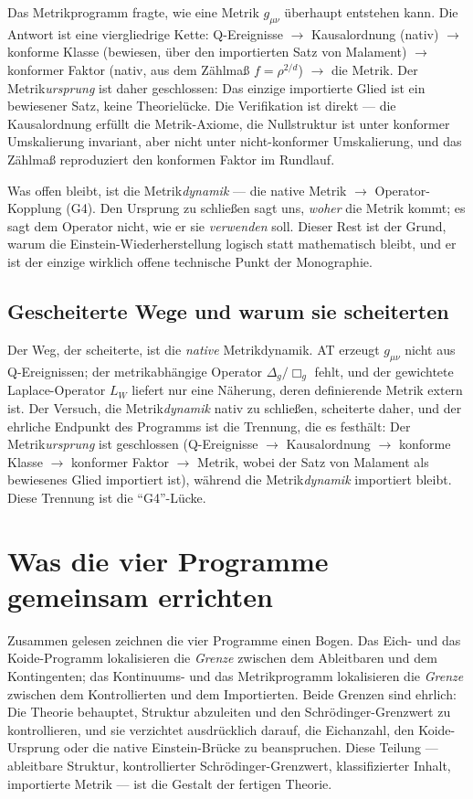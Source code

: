\documentclass[10pt,twoside,openany]{book}
\begin{document}
Das Metrikprogramm fragte, wie eine Metrik $g_{\mu\nu}$ überhaupt entstehen kann. Die
Antwort ist eine viergliedrige Kette: Q-Ereignisse $\to$ Kausalordnung (nativ) $\to$
konforme Klasse (bewiesen, über den importierten Satz von Malament) $\to$ konformer
Faktor (nativ, aus dem Zählmaß $f=\rho^{2/d}$) $\to$ die Metrik. Der
Metrik\emph{ursprung} ist daher geschlossen: Das einzige importierte Glied ist ein
bewiesener Satz, keine Theorielücke. Die Verifikation ist direkt --- die Kausalordnung
erfüllt die Metrik-Axiome, die Nullstruktur ist unter konformer Umskalierung invariant,
aber nicht unter nicht-konformer Umskalierung, und das Zählmaß reproduziert den konformen
Faktor im Rundlauf.

Was offen bleibt, ist die Metrik\emph{dynamik} --- die native Metrik $\to$
Operator-Kopplung (G4). Den Ursprung zu schließen sagt uns, \emph{woher} die Metrik
kommt; es sagt dem Operator nicht, wie er sie \emph{verwenden} soll. Dieser Rest ist der
Grund, warum die Einstein-Wiederherstellung logisch statt mathematisch bleibt, und er ist
der einzige wirklich offene technische Punkt der Monographie.

\subsection{Gescheiterte Wege und warum sie scheiterten}

Der Weg, der scheiterte, ist die \emph{native} Metrikdynamik. AT erzeugt $g_{\mu\nu}$
nicht aus Q-Ereignissen; der metrikabhängige Operator $\Delta_g/\Box_g$ fehlt, und der
gewichtete Laplace-Operator $L_W$ liefert nur eine Näherung, deren definierende Metrik
extern ist. Der Versuch, die Metrik\emph{dynamik} nativ zu schließen, scheiterte daher,
und der ehrliche Endpunkt des Programms ist die Trennung, die es festhält: Der
Metrik\emph{ursprung} ist geschlossen (Q-Ereignisse $\to$ Kausalordnung $\to$ konforme
Klasse $\to$ konformer Faktor $\to$ Metrik, wobei der Satz von Malament als bewiesenes
Glied importiert ist), während die Metrik\emph{dynamik} importiert bleibt. Diese Trennung
ist die ``G4''-Lücke.

\section{Was die vier Programme gemeinsam errichten}

Zusammen gelesen zeichnen die vier Programme einen Bogen. Das Eich- und das
Koide-Programm lokalisieren die \emph{Grenze} zwischen dem Ableitbaren und dem
Kontingenten; das Kontinuums- und das Metrikprogramm lokalisieren die \emph{Grenze}
zwischen dem Kontrollierten und dem Importierten. Beide Grenzen sind ehrlich: Die Theorie
behauptet, Struktur abzuleiten und den Schr\"odinger-Grenzwert zu kontrollieren, und sie
verzichtet ausdrücklich darauf, die Eichanzahl, den Koide-Ursprung oder die native
Einstein-Brücke zu beanspruchen. Diese Teilung --- ableitbare Struktur, kontrollierter
Schr\"odinger-Grenzwert, klassifizierter Inhalt, importierte Metrik --- ist die Gestalt
der fertigen Theorie.
\end{document}
